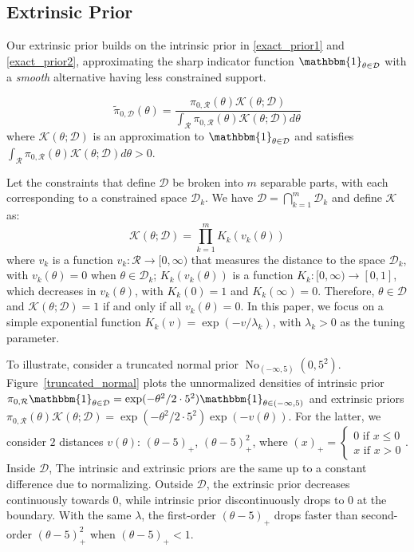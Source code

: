 \documentclass[10pt]{article}
\newcommand{\mc}[1]{\mathcal{#1}}
\DeclareMathOperator{\No}{No}
\DeclareMathOperator{\1}{\mathbbm{1}}
\begin{document}
\subsection{Extrinsic Prior}
Our extrinsic prior builds on the intrinsic prior in \eqref{exact_prior1} and \eqref{exact_prior2}, approximating the sharp indicator function
$\mathbbm{1}_{\theta\in \mc D}$ with a {\em smooth} alternative having less constrained support.

\begin{equation}
\label{extrinsic_prior}
	\tilde{\pi}_{0,\mc D}(\theta) = \frac{ \pi_{0,\mc R}(\theta) \mc{K}( \theta; \mc D) }{ \int_{\mc R} \pi_{0,\mc R}(\theta) \mc{K}(\theta; \mc D)d\theta }
\end{equation}
where $\mc K(\theta; \mc D)$ is an approximation to $\mathbbm{1}_{\theta\in \mc D}$ and satisfies  $ \int_{\mc R} \pi_{0,\mc R}(\theta) \mc{K}(\theta; \mc D)d\theta>0$.

Let the constraints that define $\mc D$ be broken into $m$ separable parts, with each corresponding to a constrained space $\mc D_k$. We have $\mc D = \bigcap_{k=1}^m\mc D_k$ and define $\mc K$ as:
\begin{equation}
\label{smoothing}
\mc K(\theta; \mc D)= \prod_{k=1}^m K_k(v_k(\theta))
\end{equation}
where $v_k$ is a function $v_k: \mc R \rightarrow [0,\infty)$ that measures the distance to the space $\mc D_k$, with $v_k(\theta)=0$ when $\theta\in \mc D_k$; $K_k(v_k(\theta))$ is a function $K_k:[0,\infty)\rightarrow [0,1]$, which decreases in $v_k(\theta)$, with $K_k(0)=1$ and $K_k(\infty)=0$. Therefore,  $\theta\in \mc D$ and $\mc K(\theta;\mc D)=1$ if and only if all $v_k(\theta)=0$. In this paper, we focus on a simple exponential function $K_k(v) = \exp(-v/\lambda_k)$, with $\lambda_k>0$ as the tuning parameter.

To illustrate, consider a truncated normal prior $\No_{(-\infty,5)}(0,5^2)$. Figure~\ref{truncated_normal} plots the unnormalized densities of intrinsic prior $\pi_{0,\mc R}\mathbbm{1}_{\theta\in \mc D}=\exp(-{\theta^2}/{2\cdot 5^2})\mathbbm{1}_{\theta\in (-\infty,5)}$ and extrinsic priors $ \pi_{0,\mc R}(\theta) \mc{K}( \theta; \mc D) = \exp(-{\theta^2}/{2\cdot 5^2}) \exp(-v(\theta))$. For the latter, we consider $2$ distances $v(\theta)$: $(\theta-5)_+$, $(\theta-5)^2_+$, where $(x)_+ = \left\{\begin{array}{cc}  0 \text{ if } x\le 0 \\ x \text{ if } x> 0\end{array}\right.$. Inside $\mc D$, The intrinsic and extrinsic priors are the same up to a constant difference due to normalizing. Outside $\mc D$, the extrinsic prior decreases continuously towards 0, while intrinsic prior discontinuously drops to $0$ at the boundary. With the same $\lambda$, the first-order $(\theta-5)_+$ drops faster than second-order $(\theta-5)_+^2$ when $(\theta-5)_+<1$.%
\end{document}
